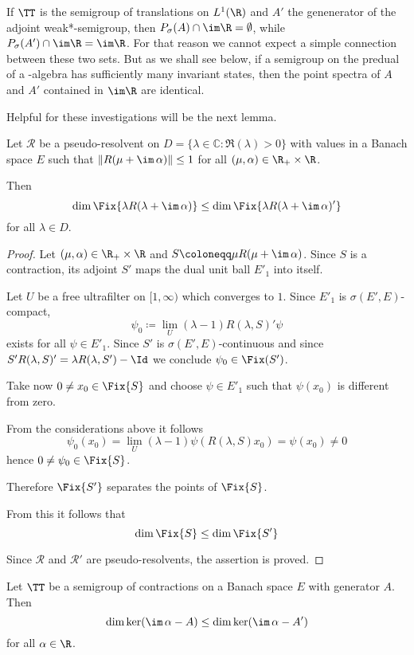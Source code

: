 If $\TT$ is the semigroup of translations on $L^1(\R)$ and $A'$ the genenerator 
of the adjoint weak*-semigroup, then $P_{\sigma}(A) \cap \im\R = \emptyset$, while $P_{\sigma}(A') \cap \im\R = \im\R$.
For that reason we cannot expect a simple connection between these two sets.
But as we shall see below, if a semigroup on the predual of a \WA-algebra has sufficiently many invariant states, then the point spectra of $A$ and $A'$ contained in $\im\R$ are identical.

Helpful for these investigations will be the next lemma.
\begin{lemma}\label{lem:d3-1.6}
Let $\mathcal{R}$ be a pseudo-resolvent on $D = \{\lambda \in \mathbb{C} \colon \Re(\lambda) > 0\}$ with values in a Banach space $E$ such that $\|R(\mu + \im\,\alpha)\| \leq 1$ for all $(\mu,\alpha) \in \R_{+} \times \R$.

Then
\[
\dim \Fix{\lambda R(\lambda + \im\,\alpha)} \leq \dim \Fix{\lambda R(\lambda + \im\,\alpha)'} 
\]
for all $\lambda \in D$.
\end{lemma}

\begin{proof}
Let $(\mu,\alpha) \in \R_{+} \times \R$ and $S \coloneqq \mu R(\mu + \im\,\alpha)$.
Since $S$ is a contraction, its adjoint $S'$ maps the dual unit ball $E'_{1}$ into itself.

Let $U$ be a free ultrafilter on $[1,\infty)$ which converges to $1$.
Since $E'_{1}$ is $\sigma(E',E)$-compact,
\[
\psi_{0} \coloneqq \lim_{U}(\lambda - 1)R(\lambda,S)'\psi
\]
exists for all $\psi \in E'_{1}$.
Since $S'$ is $\sigma(E',E)$-continuous and since $S'R(\lambda,S)' = \lambda R(\lambda,S')-\Id$ we conclude $\psi_{0} \in \Fix(S')$.

Take now $0 \neq x_{0} \in \Fix{S}$ and choose $\psi \in E'_{1}$ such that $\psi(x_{0})$ is different from zero.

From the considerations above it follows
\[
\psi_{0}(x_{0}) = \lim_{U}(\lambda - 1)\psi(R(\lambda,S)x_{0}) = \psi(x_{0}) \neq 0
\]
hence $0 \neq \psi_{0} \in \Fix{S}$.

Therefore $\Fix{S'}$ separates the points of $\Fix{S}$.

From this it follows that
\[
\dim \Fix{S} \leq \dim \Fix{S'}
\]

Since $\mathcal{R}$ and $\mathcal{R'}$ are pseudo-resolvents, the assertion is proved.
\end{proof}
\begin{corollary}\label{cor:d3-1.7}
Let $\TT$ be a semigroup of contractions on a Banach space $E$ with generator $A$.
Then
\[
\dim \ker(\im\,\alpha - A) \leq \dim \ker(\im\,\alpha - A')
\]
for all $\alpha \in \R$.
\end{corollary}

